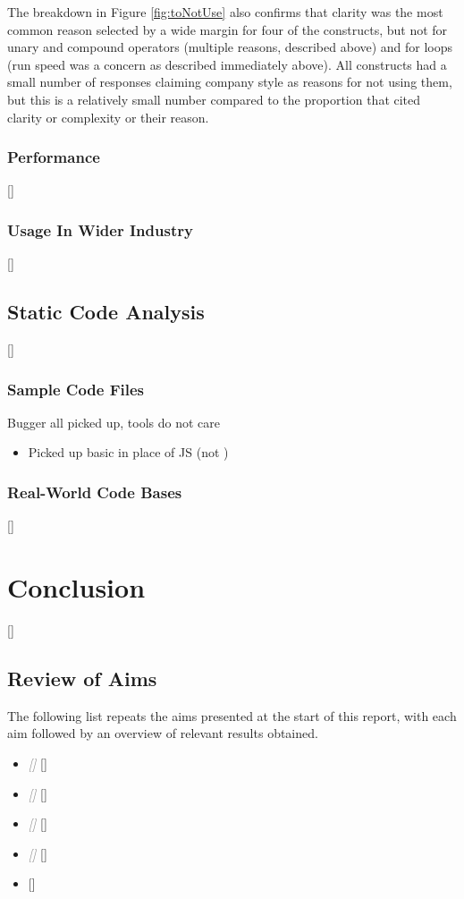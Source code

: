 \documentclass{article}
\begin{document}
            The breakdown in Figure \ref{fig:toNotUse} also confirms that clarity was the most common reason selected by a wide margin for four of the constructs, but not for unary and compound operators (multiple reasons, described above) and 
            for  loops (run speed was a concern as described immediately above).
            All constructs had a small number of responses claiming company style as reasons for not using them, but this is a relatively small number compared to the proportion that cited clarity or complexity or their reason.
        \subsubsection{Performance}
            []
        \subsubsection{Usage In Wider Industry}
            []
    \subsection{Static Code Analysis}
        []
        \subsubsection{Sample Code Files}
            Bugger all picked up, tools do not care
            \begin{itemize}
                \item Picked up basic  in place of JS  (not )
            \end{itemize}
        \subsubsection{Real-World Code Bases}
            []
\newpage
\section{Conclusion}
\label{sec:conclusion}
    []
    \subsection{Review of Aims}
        The following list repeats the aims presented at the start of this report, with each aim followed by an overview of relevant results obtained.
        \begin{itemize}
            \item \textcolor{gray}{\textit{[]}}
                []
            \item \textcolor{gray}{\textit{[]}}
                []
            \item \textcolor{gray}{\textit{[]}}
                []
            \item \textcolor{gray}{\textit{[]}}
                []
            \item \textcolor{gray}{\textit{}}
                []
        \end{itemize}
\end{document}
